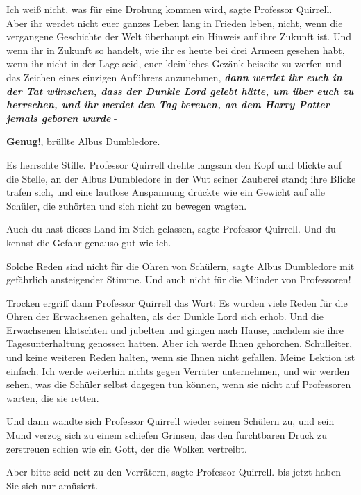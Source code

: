 \glqq{}Ich weiß nicht, was für eine Drohung kommen wird\grqq{}, sagte Professor
Quirrell. \glqq{}Aber ihr werdet nicht euer ganzes Leben lang in Frieden leben,
nicht, wenn die vergangene Geschichte der Welt überhaupt ein Hinweis auf ihre
Zukunft ist. Und wenn ihr in Zukunft so handelt, wie ihr es heute bei drei
Armeen gesehen habt, wenn ihr nicht in der Lage seid, euer kleinliches Gezänk
beiseite zu werfen und das Zeichen eines einzigen Anführers anzunehmen,
\textbf{\emph{dann werdet ihr euch in der Tat wünschen, dass der Dunkle Lord
gelebt hätte, um über euch zu herrschen, und ihr werdet den Tag bereuen, an dem
Harry Potter jemals geboren wurde} }-\grqq{}

\glqq{}\textbf{Genug}!\grqq{}, brüllte Albus Dumbledore.

Es herrschte Stille. Professor Quirrell drehte langsam den Kopf und blickte auf
die Stelle, an der Albus Dumbledore in der Wut seiner Zauberei stand; ihre
Blicke trafen sich, und eine lautlose Anspannung drückte wie ein Gewicht auf
alle Schüler, die zuhörten und sich nicht zu bewegen wagten.

\glqq{}Auch du hast dieses Land im Stich gelassen\grqq{}, sagte Professor
Quirrell. \glqq{}Und du kennst die Gefahr genauso gut wie ich.\grqq{}

\glqq{}Solche Reden sind nicht für die Ohren von Schülern\grqq{}, sagte Albus
Dumbledore mit gefährlich ansteigender Stimme. \glqq{}Und auch nicht für die
Münder von Professoren!\grqq{}

Trocken ergriff dann Professor Quirrell das Wort: \glqq{}Es wurden viele Reden
für die Ohren der Erwachsenen gehalten, als der Dunkle Lord sich erhob. Und die
Erwachsenen klatschten und jubelten und gingen nach Hause, nachdem sie ihre
Tagesunterhaltung genossen hatten. Aber ich werde Ihnen gehorchen, Schulleiter,
und keine weiteren Reden halten, wenn sie Ihnen nicht gefallen. Meine Lektion
ist einfach. Ich werde weiterhin nichts gegen Verräter unternehmen, und wir
werden sehen, was die Schüler selbst dagegen tun können, wenn sie nicht auf
Professoren warten, die sie retten.\grqq{}

Und dann wandte sich Professor Quirrell wieder seinen Schülern zu, und sein Mund
verzog sich zu einem schiefen Grinsen, das den furchtbaren Druck zu zerstreuen
schien wie ein Gott, der die Wolken vertreibt.

\glqq{}Aber bitte seid nett zu den Verrätern\grqq{}, sagte Professor Quirrell.
\glqq{}bis jetzt haben Sie sich nur amüsiert.\grqq{}

